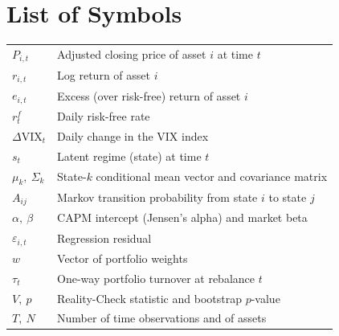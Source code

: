 \documentclass[12pt,a4paper]{article}
\newcommand{\dvix}{\Delta\mathrm{VIX}}
\newcommand{\rf}{r^{f}}
\begin{document}
\section*{List of Symbols}
\begin{tabular}{ll}
$P_{i,t}$            & Adjusted closing price of asset $i$ at time $t$ \\
$r_{i,t}$            & Log return of asset $i$ \\
$e_{i,t}$            & Excess (over risk-free) return of asset $i$ \\
$\rf_t$              & Daily risk-free rate \\
$\dvix_t$           & Daily change in the VIX index \\
$s_t$               & Latent regime (state) at time $t$ \\
$\mu_k,\ \Sigma_k$  & State-$k$ conditional mean vector and covariance matrix \\
$A_{ij}$            & Markov transition probability from state $i$ to state $j$ \\
$\alpha,\ \beta$    & CAPM intercept (Jensen's alpha) and market beta \\
$\varepsilon_{i,t}$ & Regression residual \\
$w$                 & Vector of portfolio weights \\
$\tau_t$            & One-way portfolio turnover at rebalance $t$ \\
$V,\ p$             & Reality-Check statistic and bootstrap $p$-value \\
$T,\ N$             & Number of time observations and of assets \\
\end{tabular}
\clearpage

\end{document}
